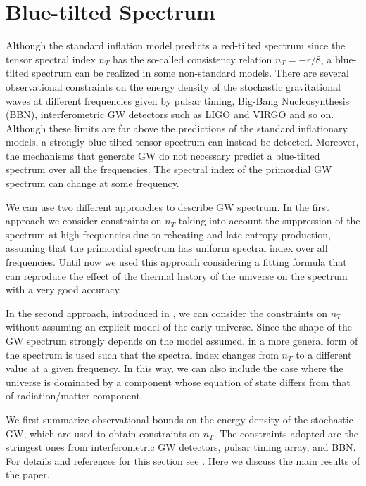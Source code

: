 \documentclass[11pt,a4paper,twoside]{book}
\begin{document}
\section{Blue-tilted Spectrum}
Although the standard inflation model predicts a red-tilted spectrum since the tensor spectral index $ n_{T} $ has the so-called consistency relation $ n_{T}=-r/8 $, a blue-tilted spectrum can be realized in some non-standard models. There are several observational constraints on the energy density of the stochastic gravitational waves at different frequencies given by pulsar timing, Big-Bang Nucleosynthesis (BBN), interferometric GW detectors such as LIGO and VIRGO and so on. Although these limits are far above the predictions of the standard inflationary models, a strongly blue-tilted tensor spectrum can instead  be detected. Moreover, the mechanisms that generate GW do not necessary  predict a blue-tilted spectrum over all the frequencies. The spectral index of the primordial GW spectrum can change at some frequency. 

We can use two different approaches to describe GW spectrum. In the first approach we consider constraints on $ n_{T} $ taking into account the suppression of the spectrum at high frequencies due to reheating and late-entropy production, assuming that the primordial spectrum has uniform spectral index over all frequencies. Until now we used this approach considering a fitting formula that can reproduce the effect of the thermal history of the universe on the spectrum with a very good accuracy.

In the second approach, introduced in \cite{Chap3:BlueTiltedSpectrum},  we can consider the constraints on $ n_{T} $ without assuming an explicit model of the early universe. Since the shape of the GW spectrum strongly depends on the model assumed, in \cite{Chap3:BlueTiltedSpectrum}
a more general form of the spectrum  is used such that the spectral index changes from $ n_{T} $ to a different value at a given frequency. In this way, we can also include the case where the universe is dominated by a component whose equation of state differs from that of radiation/matter component.

We first summarize observational bounds on the energy density of the stochastic GW, which are used to obtain constraints on $ n_{T} $. The constraints adopted are the stringest ones from interferometric GW detectors, pulsar timing array, and BBN. For details and references for this section see \cite{Chap3:BlueTiltedSpectrum}. Here we discuss the main results of the paper.
\end{document}
